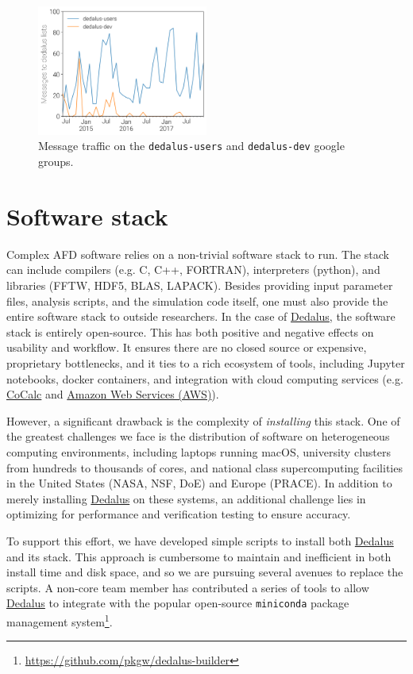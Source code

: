\documentclass[12pt, titlepage]{aastex62}
\newcommand{\dedalus}{\href{http://dedalus-project.org}{Dedalus}}
\begin{document}
\begin{figure}
  \centering
  \includegraphics[width=0.5\textwidth]{../figs/message_counts.png}
  \caption{Message traffic on the \texttt{dedalus-users} and \texttt{dedalus-dev} google groups.}
  \label{fig:messages}
\end{figure}

\section{Software stack}
\label{sec:stack}

Complex AFD software relies on a non-trivial software stack to run. The stack can include compilers (e.g. C, C++, FORTRAN), interpreters (python), and libraries (FFTW, HDF5, BLAS, LAPACK). Besides providing input parameter files, analysis scripts, and the simulation code itself, one must also provide the entire software stack to outside researchers. In the case of \dedalus{}, the software stack is entirely open-source. This has both positive and negative effects on usability and workflow. It ensures there are no closed source or expensive, proprietary bottlenecks, and it ties to a rich ecosystem of tools, including Jupyter notebooks, docker containers, and integration with cloud computing services (e.g. \href{http://cocalc.com}{CoCalc} and \href{https://aws.amazon.com}{Amazon Web Services (AWS)}). 

However, a significant drawback is the complexity of \emph{installing} this stack. One of the greatest challenges we face is the distribution of software on heterogeneous computing environments, including laptops running macOS, university clusters from hundreds to thousands of cores, and national class supercomputing facilities in the United States (NASA, NSF, DoE) and Europe (PRACE). In addition to merely installing \dedalus{} on these systems, an additional challenge lies in optimizing for performance and verification testing to ensure accuracy. 

To support this effort, we have developed simple scripts to install both \dedalus{} and its stack. This approach is cumbersome to maintain and inefficient in both install time and disk space, and so we are pursuing several avenues to replace the scripts. A non-core team member has contributed a series of tools to allow \dedalus{} to integrate with the popular open-source \texttt{miniconda} package management system\footnote{\url{https://github.com/pkgw/dedalus-builder}}.
\end{document}
